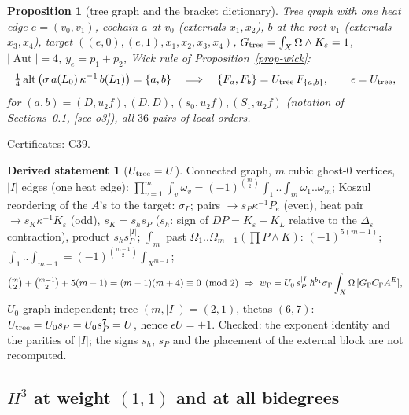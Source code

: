 \documentclass[10pt,a4paper]{article}
\numberwithin{equation}{section}
\newtheorem{proposition}[theorem]{Proposition}
\theoremstyle{definition}
\newtheorem{dstatement}[theorem]{Derived statement}
\theoremstyle{remark}
\newcommand{\alt}{\operatorname{alt}}
\newcommand{\Aut}{\operatorname{Aut}}
\newcommand{\cert}[1]{\par\noindent\textup{Certificates: #1.}\par}
\newcommand{\uf}{u_2f}
\begin{document}
\begin{proposition}[tree graph and the bracket dictionary]\label{prop-tree}
Tree graph with one heat edge $e=(v_0,v_1)$, cochain $a$ at $v_0$ (externals $x_1,x_2$), $b$ at the root $v_1$ (externals $x_3,x_4$), target $((e,0),(e,1),x_1,x_2,x_3,x_4)$, $G_{\rm tree}=\int_X\Omega\wedge K_\varepsilon=1$, $|\Aut|=4$, $y_e=p_1+p_2$, Wick rule of Proposition~\ref{prop-wick}:
\begin{equation}
\tfrac14\alt\big(\sigma\,a(L_0)\,\kappa^{-1}\,b(L_1)\big)=\{a,b\}\quad\Longrightarrow\quad \{F_a,F_b\}=U_{\rm tree}\,F_{\{a,b\}},\qquad \epsilon=U_{\rm tree},
\end{equation}
for $(a,b)=(D,\uf),(D,D),(s_0,\uf),(S_1,\uf)$ (notation of Sections~\ref{sec-H3}, \ref{sec-o3}), all $36$ pairs of local orders.
\end{proposition}
\cert{C39}

\begin{dstatement}[$U_{\rm tree}=U$]\label{ds-epsU}
Connected graph, $m$ cubic ghost-$0$ vertices, $|I|$ edges (one heat edge): $\prod_{v=1}^m\int_v\omega_v=(-1)^{\binom m2}\int_1..\int_m\omega_1..\omega_m$; Koszul reordering of the $A$'s to the target: $\sigma_\Gamma$; pairs $\to s_P\kappa^{-1}P_e$ (even), heat pair $\to s_K\kappa^{-1}K_\varepsilon$ (odd), $s_K=s_hs_P$ ($s_h$: sign of $DP=K_\varepsilon-K_L$ relative to the $\Delta_\varepsilon$ contraction), product $s_hs_P^{|I|}$; $\int_m$ past $\Omega_1..\Omega_{m-1}(\prod P\wedge K)$: $(-1)^{5(m-1)}$; $\int_1..\int_{m-1}=(-1)^{\binom{m-1}2}\int_{X^{m-1}}$;
\begin{equation}
\tbinom m2+\tbinom{m-1}2+5(m-1)=(m-1)(m+4)\equiv0\pmod2\ \Rightarrow\ w_\Gamma=U_0\,s_P^{|I|}\hbar^{b_1}\sigma_\Gamma\int_X\Omega\,[G_\Gamma C_\Gamma A^E],
\end{equation}
$U_0$ graph-independent; tree $(m,|I|)=(2,1)$, thetas $(6,7)$: $U_{\rm tree}=U_0s_P=U_0s_P^7=U$, hence $\epsilon U=+1$. Checked: the exponent identity and the parities of $|I|$; the signs $s_h$, $s_P$ and the placement of the external block are not recomputed.
\end{dstatement}

\subsection{\texorpdfstring{$H^3$ at weight $(1,1)$ and at all bidegrees}{H3 at weight (1,1) and at all bidegrees}}\label{sec-H3}
\end{document}
